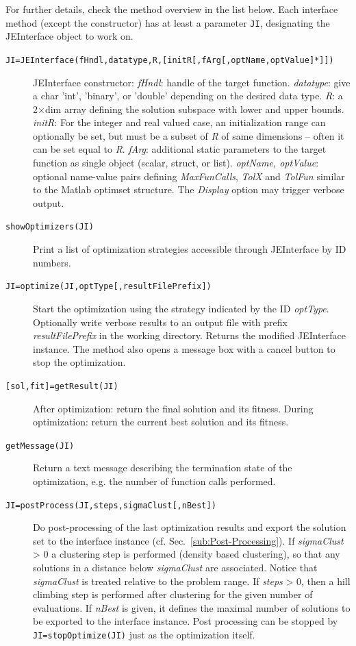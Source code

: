 For further details, check the method overview in the list below.
Each interface method (except the constructor) has at least a parameter
\texttt{JI}, designating the JEInterface object to work on.
%
\begin{description}
	\item [{\texttt{JI=JEInterface(fHndl,datatype,R,{[}initR{[},fArg{[},optName,optValue{]}{*}{]}{]})}}] JEInterface
constructor: \emph{fHndl}: handle of the target function. \emph{datatype}:
give a char 'int', 'binary', or 'double' depending on the desired
data type. \emph{R}: a 2$\times$dim array defining the solution subspace
with lower and upper bounds. \emph{initR}: For the integer and real
valued case, an initialization range can optionally be set, but must
be a subset of \emph{R} of same dimensions -- often it can be set
equal to \emph{R}. \emph{fArg}: additional static parameters to the
target function as single object (scalar, struct, or list). \emph{optName,
optValue}: optional name-value pairs defining \emph{MaxFunCalls},
\emph{TolX} and \emph{TolFun} similar to the Matlab optimset structure.
The \emph{Display} option may trigger verbose output. 
	
	\item [{\texttt{showOptimizers(JI)}}] Print a list of optimization strategies
accessible through JEInterface by ID numbers.
\item [{\texttt{JI=optimize(JI,optType{[},resultFilePrefix{]})}}] Start
the optimization using the strategy indicated by the ID \emph{optType}.
Optionally write verbose results to an output file with prefix \emph{resultFilePrefix}
in the working directory. Returns the modified JEInterface instance.
The method also opens a message box with a cancel button to stop the
optimization.

	\item [{\texttt{{[}sol,fit{]}=getResult(JI)}}] After optimization: return
the final solution and its fitness. During optimization: return the
current best solution and its fitness.

	\item [{\texttt{getMessage(JI)}}] Return a text message describing the
termination state of the optimization, e.g. the number of function
calls performed.

	\item [{\texttt{JI=postProcess(JI,steps,sigmaClust{[},nBest{]})}}] Do post-processing
of the last optimization results and export the solution set to the
interface instance (cf. Sec.~\ref{sub:Post-Processing}). If \emph{sigmaClust}
> 0 a clustering step is performed (density based clustering), so
that any solutions in a distance below \emph{sigmaClust} are associated.
Notice that \emph{sigmaClust} is treated relative to the problem range.
If \emph{steps} > 0, then a hill climbing step is performed after
clustering for the given number of evaluations. If \emph{nBest} is
given, it defines the maximal number of solutions to be exported to
the interface instance. Post processing can be stopped by \texttt{JI=stopOptimize(JI)}
just as the optimization itself.


\end{description}
